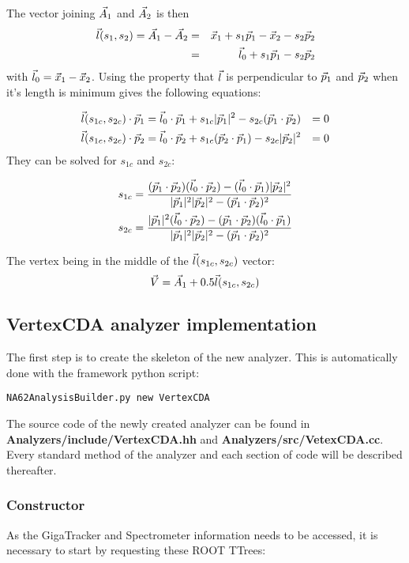 \documentclass{article}
\renewcommand{\path}[1]{\textbf{#1}}
\begin{document}
The vector joining $\vec{A}_{1}$ and $\vec{A}_{2}$ is then
\begin{eqnarray}
	\vec{l}(s_1,s_2)=\vec{A}_{1}-\vec{A}_{2} &=& \vec{x}_{1}+s_1\vec{p}_{1} - \vec{x}_{2} - s_2\vec{p}_{2}\\
	&=& \vec{l}_{0} + s_1\vec{p}_{1} - s_2\vec{p}_{2}
\end{eqnarray}
with $\vec{l}_{0} = \vec{x}_{1}-\vec{x}_{2}$. Using the property that $\vec{l}$ is perpendicular to
$\vec{p}_{1}$ and $\vec{p}_{2}$ when it's length is minimum gives the following
equations:

\begin{align}
	\vec{l}(s_{1c},s_{2c})\cdot\vec{p}_{1} &= \vec{l}_{0}\cdot\vec{p}_{1} + s_{1c}|\vec{p}_{1}|^2 -
	s_{2c}(\vec{p}_{1}\cdot\vec{p}_{2}) &= 0
	\\
	\vec{l}(s_{1c},s_{2c})\cdot\vec{p}_{2} &= \vec{l}_{0}\cdot\vec{p}_{2} + s_{1c}(\vec{p}_{2}\cdot\vec{p}_{1}) -
	s_{2c}|\vec{p}_{2}|^2 &= 0
\end{align}
They can be solved for $s_{1c}$ and $s_{2c}$:

\begin{align}
	s_{1c} &= \frac{(\vec{p}_{1}\cdot\vec{p}_{2})(\vec{l}_{0}\cdot\vec{p}_{2}) -
	(\vec{l}_{0}\cdot\vec{p}_{1})|\vec{p}_{2}|^2}{|\vec{p}_{1}|^2|\vec{p}_{2}|^2 - (\vec{p}_{1}\cdot\vec{p}_{2})^2}\\
	s_{2c} &= \frac{|\vec{p}_{1}|^2(\vec{l}_{0}\cdot\vec{p}_{2}) -
	(\vec{p}_{1}\cdot\vec{p}_{2})(\vec{l}_{0}\cdot\vec{p}_{1})}{|\vec{p}_{1}|^2|\vec{p}_{2}|^2 - (\vec{p}_{1}\cdot\vec{p}_{2})^2}
\end{align}

The vertex being in the middle of the $\vec{l}(s_{1c},s_{2c})$ vector:
\begin{equation}
	\vec{V} = \vec{A}_{1} + 0.5\vec{l}(s_{1c},s_{2c})
\end{equation}

\subsection{VertexCDA analyzer implementation}
The first step is to create the skeleton of the new analyzer. This is
automatically done with the framework python script:
\begin{lstlisting}
NA62AnalysisBuilder.py new VertexCDA
\end{lstlisting}

The source code of the newly created analyzer can be found in
\path{Analyzers/include/VertexCDA.hh} and \path{Analyzers/src/VetexCDA.cc}. Every standard method of
the analyzer and each section of code will be described thereafter.

\subsubsection{Constructor}
As the GigaTracker and Spectrometer information needs to be accessed, it is necessary to start by 
requesting these ROOT TTrees:
\end{document}
